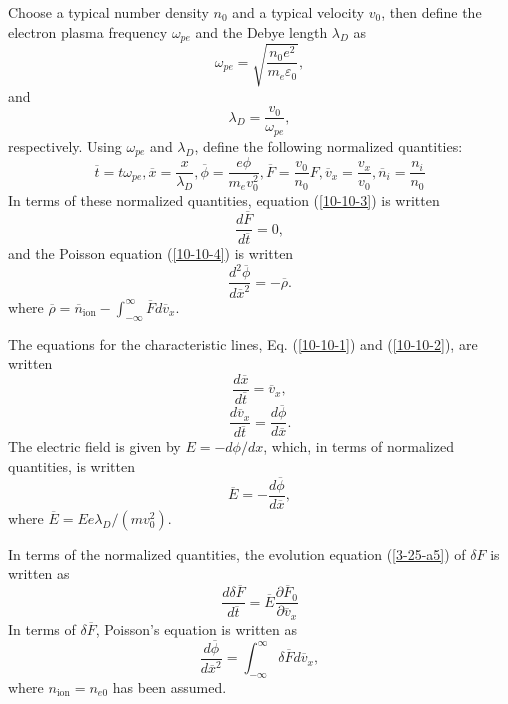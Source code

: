 \documentclass{article}
\newcommand{\nocomma}{}
\newcommand{\tmop}[1]{\ensuremath{\operatorname{#1}}}
\begin{document}
Choose a typical number density $n_0$ and a typical velocity $v_0$, then
define the electron plasma frequency $\omega_{p e}$ and the Debye length
$\lambda_D$ as
\begin{equation}
  \omega_{p e} = \sqrt{\frac{n_0 e^2}{m_e \varepsilon_0}},
\end{equation}
and
\begin{equation}
  \lambda_D = \frac{v_0}{\omega_{p e}},
\end{equation}
respectively. Using $\omega_{p e}$ and $\lambda_D$, define the following
normalized quantities:
\begin{equation}
  \overline{t} = t \omega_{p e}, \overline{x} = \frac{x}{\lambda_D},
  \overline{\phi} = \frac{e \phi}{m_e v_0^2}, \overline{F} = \frac{v_0}{n_0}
  F, \overline{v}_x = \frac{v_x}{v_0} \nocomma, \overline{n}_i =
  \frac{n_i}{n_0}
\end{equation}
In terms of these normalized quantities, equation (\ref{10-10-3}) is written
\begin{equation}
  \label{2-12-1} \frac{d \overline{F}}{d \overline{t}} = 0,
\end{equation}
and the Poisson equation (\ref{10-10-4}) is written
\begin{equation}
  \label{11-4-p1} \frac{d^2 \overline{\phi}}{d \overline{x}^2} = -
  \overline{\rho} .
\end{equation}
where $\overline{\rho} = \overline{n}_{\tmop{ion}} - \int_{- \infty}^{\infty}
\overline{F} d \overline{v}_x$.

The equations for the characteristic lines, Eq. (\ref{10-10-1}) and
(\ref{10-10-2}), are written
\begin{equation}
  \label{12-24-1} \frac{d \overline{x}}{d \overline{t}} = \overline{v}_x,
\end{equation}
\begin{equation}
  \label{12-24-2} \frac{d \overline{v}_x}{d \overline{t}} = \frac{d
  \overline{\phi}}{d \overline{x}} .
\end{equation}
The electric field is given by $E = - d \phi / d x$, which, in terms of
normalized quantities, is written
\begin{equation}
  \overline{E} = - \frac{d \overline{\phi}}{d \overline{x}},
\end{equation}
where $\overline{E} = E e \lambda_D / (m v_0^2)$.

In terms of the normalized quantities, the evolution equation (\ref{3-25-a5})
of $\delta F$ is written as
\begin{equation}
  \label{16-3-1-1} \frac{d \delta \overline{F}}{d \overline{t}} = \overline{E}
  \frac{\partial \overline{F}_0}{\partial \overline{v}_x}
\end{equation}
In terms of $\delta \overline{F}$, Poisson's equation is written as
\begin{equation}
  \frac{d \overline{\phi}}{d \overline{x}^2} = \int_{- \infty}^{\infty} \delta
  \overline{F} d \overline{v}_x,
\end{equation}
where $n_{\tmop{ion}} = n_{e 0}$ has been assumed.
\end{document}
